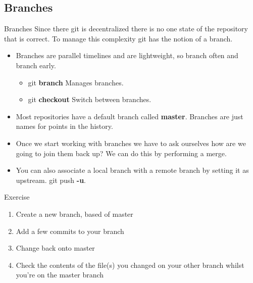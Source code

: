 \documentclass{beamer}
\begin{document}
\subsection{Branches}
\begin{frame}[fragile]{Branches}
  Since there git is decentralized there is no one state of the repository that is correct. To manage this complexity git has the notion of a branch. 
  \begin{itemize}
    \item Branches are parallel timelines and are lightweight, so branch often and branch early.
  \begin{block}{}
    \begin{itemize}
      \item git \textbf{branch}  Manages branches. 
      \item git \textbf{checkout} Switch between branches.
    \end{itemize}
  \end{block}
    \item Most repositories have a default branch called \textbf{master}. Branches are just names for points in the history.
    \item Once we start working with branches we have to ask ourselves how are we going to join them back up? We can do this by performing a merge.

    \item You can also associate a local branch with a remote branch by setting it as upstream. git push \textbf{-u}.
  \end{itemize}
\end{frame}

\begin{frame}
  \begin{block}{Exercise}
    \begin{enumerate}
      \item Create a new branch, based of master
      \item Add a few commits to your branch
      \item Change back onto master
      \item Check the contents of the file(s) you changed on your other branch whilst you\rq{}re on the master branch
    \end{enumerate}
  \end{block}
\end{frame}




\end{document}
